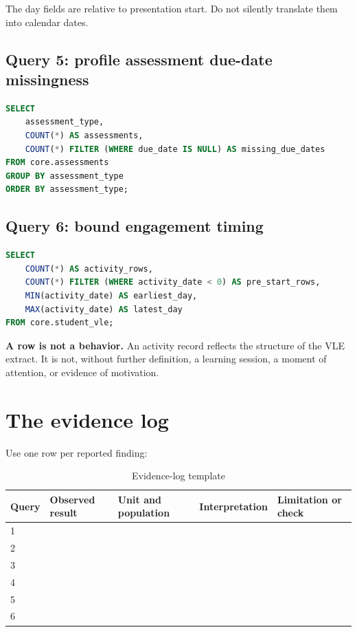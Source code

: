 The day fields are relative to presentation start. Do not silently translate
them into calendar dates.

\subsection{Query 5: profile assessment due-date missingness}

\begin{lstlisting}[language=SQL]
SELECT
    assessment_type,
    COUNT(*) AS assessments,
    COUNT(*) FILTER (WHERE due_date IS NULL) AS missing_due_dates
FROM core.assessments
GROUP BY assessment_type
ORDER BY assessment_type;
\end{lstlisting}

\subsection{Query 6: bound engagement timing}

\begin{lstlisting}[language=SQL]
SELECT
    COUNT(*) AS activity_rows,
    COUNT(*) FILTER (WHERE activity_date < 0) AS pre_start_rows,
    MIN(activity_date) AS earliest_day,
    MAX(activity_date) AS latest_day
FROM core.student_vle;
\end{lstlisting}

\begin{commonmistakes}
\textbf{A row is not a behavior.}
An activity record reflects the structure of the VLE extract. It is not,
without further definition, a learning session, a moment of attention, or
evidence of motivation.
\end{commonmistakes}

\section{The evidence log}

Use one row per reported finding:

\begin{table}[htbp]
\centering
\small
\caption{Evidence-log template}
\label{tab:evidence-log}
\begin{tabularx}{\textwidth}{@{}p{}XXXX@{}}
\toprule
Query & Observed result & Unit and population & Interpretation & Limitation or check \\
\midrule
1 & & & & \\
2 & & & & \\
3 & & & & \\
4 & & & & \\
5 & & & & \\
6 & & & & \\
\bottomrule
\end{tabularx}
\end{table}

